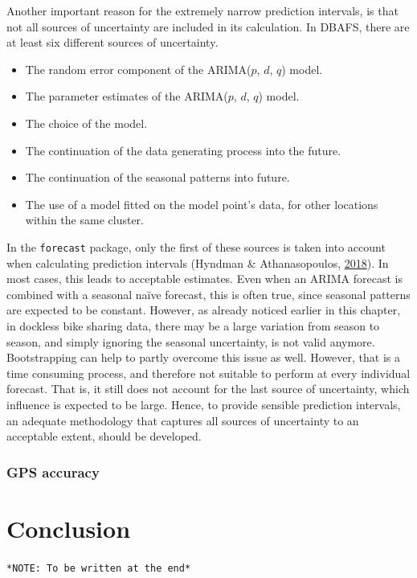 \documentclass[12pt,oneside]{reedthesis}
\providecommand{\tightlist}{%
  \setlength{\itemsep}{0pt}\setlength{\parskip}{0pt}}
\begin{document}
Another important reason for the extremely narrow prediction intervals,
is that not all sources of uncertainty are included in its calculation.
In DBAFS, there are at least six different sources of uncertainty.
\begin{itemize}
\tightlist
\item
  The random error component of the ARIMA(\(p\), \(d\), \(q\)) model.
\item
  The parameter estimates of the ARIMA(\(p\), \(d\), \(q\)) model.
\item
  The choice of the model.
\item
  The continuation of the data generating process into the future.
\item
  The continuation of the seasonal patterns into future.
\item
  The use of a model fitted on the model point's data, for other
  locations within the same cluster.
\end{itemize}
In the \texttt{forecast} package, only the first of these sources is
taken into account when calculating prediction intervals (Hyndman \&
Athanasopoulos, \protect\hyperlink{ref-hyndman2018fpp}{2018}). In most
cases, this leads to acceptable estimates. Even when an ARIMA forecast
is combined with a seasonal naïve forecast, this is often true, since
seasonal patterns are expected to be constant. However, as already
noticed earlier in this chapter, in dockless bike sharing data, there
may be a large variation from season to season, and simply ignoring the
seasonal uncertainty, is not valid anymore. Bootstrapping can help to
partly overcome this issue as well. However, that is a time consuming
process, and therefore not suitable to perform at every individual
forecast. That is, it still does not account for the last source of
uncertainty, which influence is expected to be large. Hence, to provide
sensible prediction intervals, an adequate methodology that captures all
sources of uncertainty to an acceptable extent, should be developed.

\subsection{GPS accuracy}\label{gps-accuracy}

\chapter{Conclusion}\label{conclusion}

\texttt{*NOTE:\ To\ be\ written\ at\ the\ end*}
\end{document}

